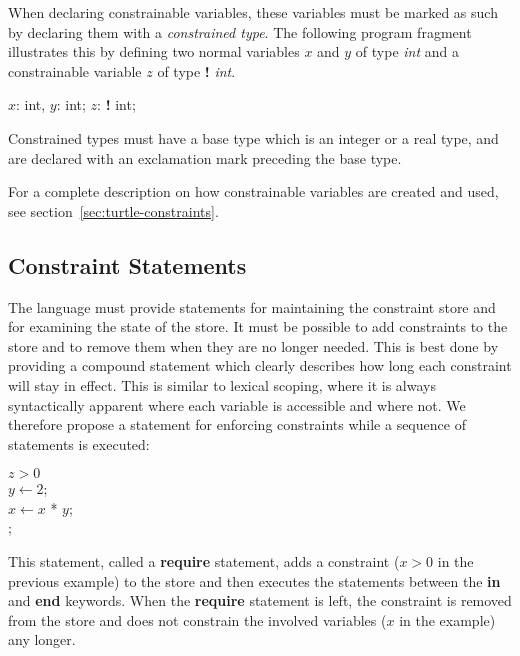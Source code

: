 
When declaring constrainable variables, these variables must be marked
as such by declaring them with a {\em constrained type}.  The
following program fragment illustrates this by defining two normal
variables $x$ and $y$ of type {\em int} and a constrainable variable
$z$ of type {\bf !} {\em int}.

\begin{ttlprog}
\>\ttlVar{} $x$: int, $y$: int;\quad\ttlVar{} $z$: {\bf!} int;
\end{ttlprog}
%
Constrained types must have a base type which is an integer or a real
type, and are declared with an exclamation mark preceding the base
type.

For a complete description on how constrainable variables are created
and used, see section~\ref{sec:turtle-constraints}.

%
%
\subsection{Constraint Statements}
\label{sec:constraint-statements}

The language must provide statements for maintaining the constraint
store and for examining the state of the store.  It must be possible
to add constraints to the store and to remove them when they are no
longer needed.  This is best done by providing a compound statement
which clearly describes how long each constraint will stay in effect.
This is similar to lexical scoping, where it is always syntactically
apparent where each variable is accessible and where not.  We
therefore propose a statement for enforcing constraints while a
sequence of statements is executed:
%
\begin{ttlprog}
\>\ttlRequire{} $z > 0$ \\
\>\>$y \leftarrow 2$;\\
\>\>$x \leftarrow x$ * $y$;\\
\>\ttlEnd{};
\end{ttlprog}
%
This statement, called a {\bf require} statement, adds a constraint
($x>0$ in the previous example) to the store and then executes the
statements between the {\bf in} and {\bf end} keywords.  When the {\bf
  require} statement is left, the constraint is removed from the store
and does not constrain the involved variables ($x$ in the example) any
longer.


